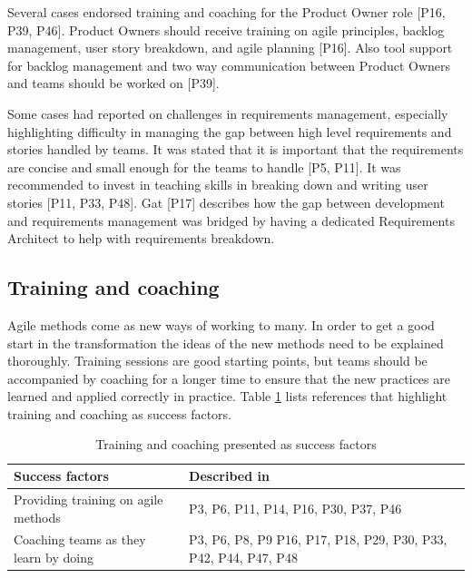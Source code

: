 Several cases endorsed training and coaching for the Product Owner role [P16,
P39, P46]. Product Owners should receive training on agile principles, backlog
management, user story breakdown, and agile planning [P16]. Also tool support
for backlog management and two way communication between Product Owners and
teams should be worked on [P39].


Some cases had reported on challenges in requirements management, especially
highlighting difficulty in managing the gap between high level requirements and
stories handled by teams. It was stated that it is important that the
requirements are concise and small enough for the teams to handle [P5, P11].
It was recommended to invest in teaching skills in breaking down and writing
user stories [P11, P33, P48]. Gat [P17] describes how the gap between
development and requirements management was bridged by having a dedicated
Requirements Architect to help with requirements breakdown.


\subsection{Training and coaching}

Agile methods come as new ways of working to many. In order to get a good start
in the transformation the ideas of the new methods need to be explained
thoroughly. Training sessions are good starting points, but teams should be
accompanied by coaching for a longer time to ensure that the new practices are
learned and applied correctly in practice. Table \ref{table:success_training}
lists references that highlight training and coaching as success factors.

\begin{table}[h]
    \centering
    \begin{tabular}{ >{\raggedright\arraybackslash}p{}
                     >{\raggedright\arraybackslash}p{} }
        \toprule
        Success factors  &  Described in \\
        \midrule
        Providing training on agile methods  &
                P3, P6, P11, P14, P16, P30, P37, P46 \\
        Coaching teams as they learn by doing  &
                P3, P6, P8, P9 P16, P17, P18, P29,
                P30, P33, P42, P44, P47, P48  \\
        \bottomrule
    \end{tabular}
    \caption{Training and coaching presented as success factors}
    \label{table:success_training}
\end{table}

